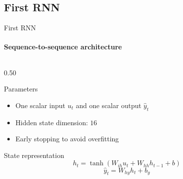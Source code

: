 \subsection{First RNN}

\begin{frame}{First RNN}
    \framesubtitle{Sequence-to-sequence architecture}
    
    \begin{columns}[T,onlytextwidth]
        \begin{column}{0.50\textwidth}
            \begin{block}{Parameters}
                \begin{itemize}
                    \item One scalar input $u_t$ and one scalar output $\hat{y}_t$
                    \item Hidden state dimension: $16$
                    \item Early stopping to avoid overfitting
                \end{itemize}
            \end{block}

            \begin{block}{State representation}
                \setlength{\abovedisplayskip}{2pt}\setlength{\belowdisplayskip}{2pt}
                \begin{equation*}
                    h_t = \tanh(W_{ih}u_t + W_{hh}h_{t-1} + b)
                \end{equation*}
                \begin{equation*}
                    \hat{y}_t = W_{hy}h_t + b_y
                \end{equation*}
            \end{block}
        \end{column}


\end{columns}
\end{frame}
